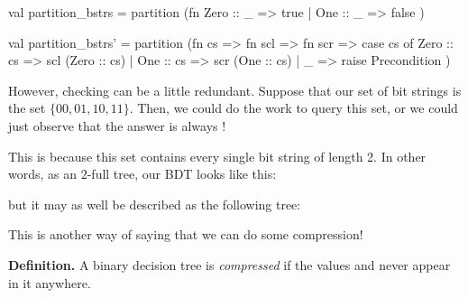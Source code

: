 \documentclass[addpoints,12pt]{exam}
\begin{document}
\begin{questions}
\begin{parts}
    \begin{solutionorbox}[20em]
      \begin{codeblock}
        val partition_bstrs =
          partition
            (fn Zero :: _ => true
              | One  :: _ => false
            )

        val partition_bstrs' =
          partition
            (fn cs => fn scl => fn scr =>
              case cs of
                Zero :: cs => scl (Zero :: cs)
              | One :: cs => scr (One :: cs)
              | _ => raise Precondition
            )
      \end{codeblock}
    \end{solutionorbox}

  \begin{EnvUplevel}
    However, checking can be a little redundant. Suppose that our set of
    bit strings is the set $\{ 00, 01, 10, 11 \}$. Then,
    we could do the work to query this set, or we could
    just observe that the answer is always !

    This is because this set contains every single bit string of length
    2. In other words, as an $2$-full tree, our BDT looks like this:

    \begin{center}
    \end{center}

    but it may as well be described as the following tree:

    \vspace{10pt}

    \begin{center}
    \end{center}

    \vspace{10pt}

    This is another way of saying that we can do some compression!

    \textbf{Definition.} A binary decision tree  is
    \textit{compressed} if the values  and
     never appear in it anywhere.
  \end{EnvUplevel}




\end{parts}
\end{questions}
\end{document}
